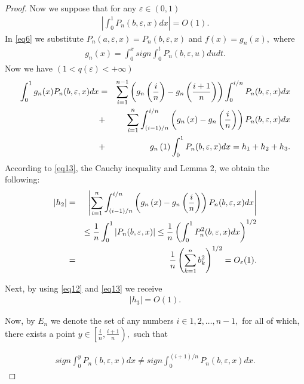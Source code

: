 \documentclass{publmathdeb}
\begin{document}
\begin{proof}
		Now we suppose that for any $\varepsilon \in (0,1)$
		\begin{eqnarray}
			\label{eq12} \left|\int_{0}^{1} P_n (b, \varepsilon, x) dx\right| = O(1).
		\end{eqnarray}
		In \eqref{eq6} we substitute $P_n( a, \varepsilon, x)=P_n(b, \varepsilon,x)$ and $f(x)= g_n (x),$ where	
		\begin{eqnarray}
			\label{eq13} g_n(x) = \int_{0}^{x} sign \int_{0}^{t} P_n(b,  \varepsilon, u)du dt.
		\end{eqnarray}
		Now we have $(1<q(\varepsilon)<+\infty)$
		\begin{eqnarray}
			\label{eq14} \int_{0}^{1} g_n (x) P_n (b, \varepsilon, x) dx
			&=& \sum_{i=1}^{n-1}\left(g_n\left(\frac{i}{n}\right)-g_n\left(\frac{i+1}{n}\right)\right)\int_{0}^{i/n}P_n(b, \varepsilon, x)dx \notag   \\
			&+& \sum_{i=1}^{n}\int_{\left(i-1\right)/n}^{i/n}\left(g_n\left(x\right) -g_n\left(\frac{i}{n}\right)\right)P_n(b, \varepsilon, x) dx  \notag    \\
			&+& g_n\left(1\right)\int_{0}^{1}P_n(b, \varepsilon, x)dx=h_1 +h_2  +h_3.   
		\end{eqnarray}
		According to \eqref{eq13}, the Cauchy inequality and Lemma 2, we obtain the following:	
		\begin{eqnarray} \label{eq15}
			\left|h_2\right| &=& \left| \sum_{i=1}^{n}\int_{\left(i-1\right)/n}^{i/n}\left(g_n\left(x\right) -g_n\left(\frac{i}{n}\right)\right)P_n(b, \varepsilon, x) dx \right|   \\ 
			&& \leq \frac{1}{n} \int_{0}^{1} \left|P_n (b, \varepsilon, x)\right| \leq \frac{1}{n} \left(\int_{0}^{1} P_n^2 (b, \varepsilon, x)dx\right)^{1/2} \notag\\   
			&=& \frac{1}{n} \left(\sum_{k=1}^{n} b_k^2\right)^{1/2}  = O_{\varepsilon}(1). \notag
		\end{eqnarray}
		
		Next, by using \eqref{eq12} and \eqref{eq13} we receive 
		\begin{eqnarray}
			\label{eq16}
			\left|h_3\right| = O(1).
		\end{eqnarray}
		
		Now, by $E_n$ we denote the set of any numbers $i\in {1,2,\dots,n-1},$ for all of which, there exists a point $y\in \left[\frac{i}{n}, \frac{i+1}{n} \right),$   such that 
		
		\begin{eqnarray*}
			sign\int_{0}^{y} P_n(b, \varepsilon, x) dx \ne sign\int_{0}^{(i+1)/n} P_n(b, \varepsilon, x) dx.
		\end{eqnarray*}
		

\end{proof}
\end{document}
